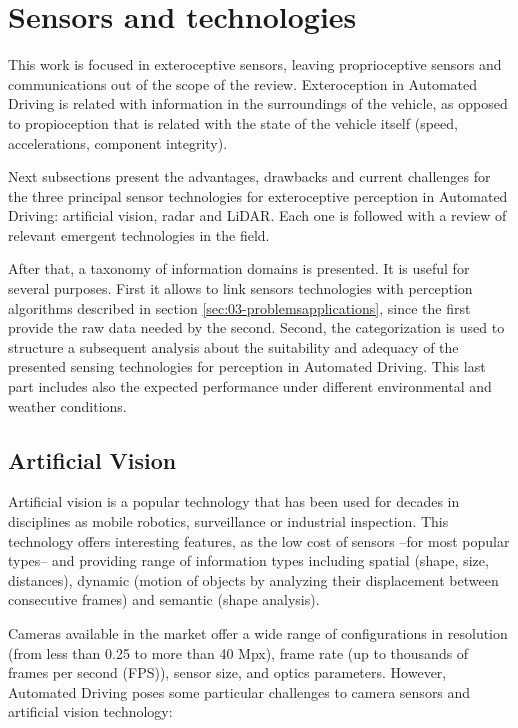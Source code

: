 \documentclass[journal]{IEEEtran}
\begin{document}
\section{Sensors and technologies}
\label{sec:02-sensors}

This work is focused in exteroceptive sensors, leaving proprioceptive sensors
and communications out of the scope of the review.
Exteroception in Automated Driving is related with information in the
surroundings of the vehicle, as opposed to propioception that is related with 
the state of the vehicle itself (speed, accelerations, component integrity). 

Next subsections present the advantages, drawbacks and current challenges for 
the three principal sensor technologies for exteroceptive perception in
Automated Driving: artificial vision, radar and LiDAR. 
Each one is followed with a review of relevant emergent technologies in the
field.

After that, a taxonomy of information domains is presented. It is useful for
several purposes. First it allows to link sensors technologies with perception 
algorithms described in section \ref{sec:03-problemsapplications}, 
since the first provide the raw data needed by the second. 
Second, the categorization is used to structure a subsequent
analysis about the suitability and adequacy of the presented sensing 
technologies for perception in Automated Driving. 
This last part includes also the expected performance under different
environmental and weather conditions.

\subsection{Artificial Vision}
Artificial vision is a popular technology that has been used for decades in 
disciplines as mobile robotics, surveillance or industrial inspection. 
This technology offers interesting features, as the low cost of sensors 
--for most popular types-- and providing range of information types including
spatial (shape, size, distances), dynamic (motion of objects by analyzing their 
displacement between consecutive frames) and semantic (shape analysis).

Cameras available in the market offer a wide range of configurations in
resolution (from less than 0.25 to more than 40 Mpx), frame rate (up to
thousands of frames per second (FPS)), sensor size, and optics parameters.
However, Automated Driving poses some particular challenges to camera sensors
and artificial vision technology:
\end{document}

